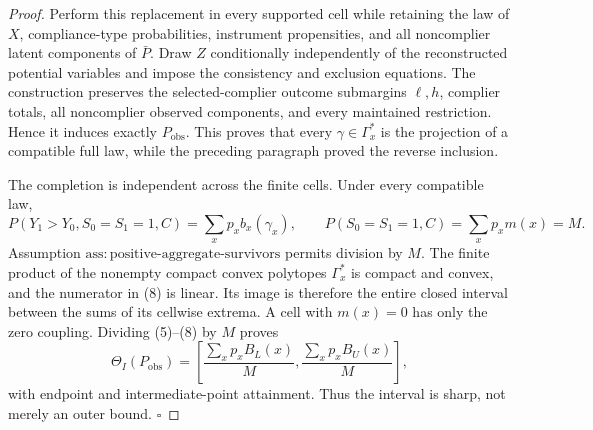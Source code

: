 \documentclass{article}
\begin{document}
\begin{proof}
Perform this replacement in every supported cell while retaining the
law of \(X\), compliance-type probabilities, instrument propensities,
and all noncomplier latent components of \(\bar P\).  Draw \(Z\)
conditionally independently of the reconstructed potential variables
and impose the consistency and exclusion equations.  The construction
preserves the selected-complier outcome submargins \(\ell,h\), complier
totals, all noncomplier observed components, and every maintained
restriction.  Hence it induces exactly \(P_{\mathrm{obs}}\).  This proves
that every \(\gamma\in\Gamma_x^{\ast}\) is the projection of a compatible
full law, while the preceding paragraph proved the reverse inclusion.

The completion is independent across the finite cells.  Under every
compatible law,
\[
P(Y_1>Y_0,S_0=S_1=1,C)=\sum_xp_xb_x(\gamma_x),
\qquad
P(S_0=S_1=1,C)=\sum_xp_xm(x)=M.
\tag{8}
\]
Assumption \(\mathrm{ass{:}positive\text{-}aggregate\text{-}survivors}\)
permits division by \(M\).  The finite product of the nonempty compact
convex polytopes \(\Gamma_x^{\ast}\) is compact and convex, and the
numerator in (8) is linear.  Its image is therefore the entire closed
interval between the sums of its cellwise extrema.  A cell with
\(m(x)=0\) has only the zero coupling.  Dividing (5)--(8) by \(M\) proves
\[
\Theta_I(P_{\mathrm{obs}})
=\left[\frac{\sum_xp_xB_L(x)}{M},
       \frac{\sum_xp_xB_U(x)}{M}\right],
\]
with endpoint and intermediate-point attainment.  Thus the interval is
sharp, not merely an outer bound. \(\square\)
\end{proof}
\end{document}
